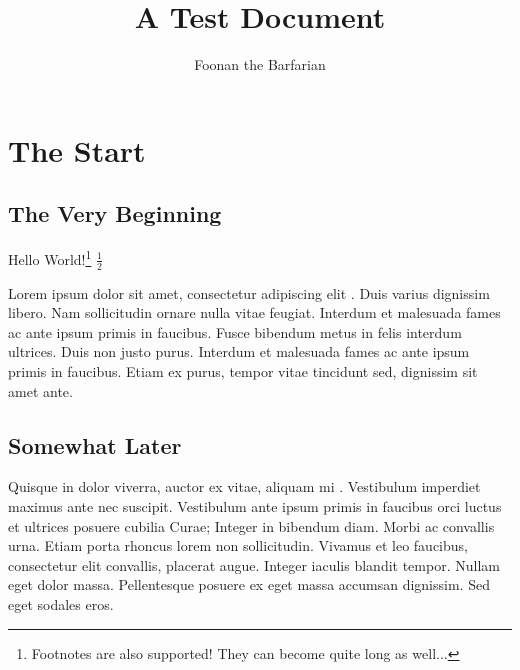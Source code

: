 \documentclass{article}
\begin{document}
\title{A Test Document}
\author{Foonan the Barfarian}

\section{The Start}
\subsection{The Very Beginning}
Hello World!\footnote{Footnotes are also supported! They can become quite long as well...}
$\frac    {1}
2$

Lorem ipsum dolor sit amet, consectetur adipiscing elit \cite{Hox_Gradient}. Duis varius dignissim libero. Nam sollicitudin ornare nulla vitae feugiat. Interdum et malesuada fames ac ante ipsum primis in faucibus. Fusce bibendum metus in felis interdum ultrices. Duis non justo purus. Interdum et malesuada fames ac ante ipsum primis in faucibus. Etiam ex purus, tempor vitae tincidunt sed, dignissim sit amet ante.

\subsection{Somewhat Later}
Quisque in dolor viverra, auctor ex vitae, aliquam mi \cite{foo}. Vestibulum imperdiet maximus ante nec suscipit. Vestibulum ante ipsum primis in faucibus orci luctus et ultrices posuere cubilia Curae; Integer in bibendum diam. Morbi ac convallis urna. Etiam porta rhoncus lorem non sollicitudin. Vivamus et leo faucibus, consectetur elit convallis, placerat augue. Integer iaculis blandit tempor. Nullam eget dolor massa. Pellentesque posuere ex eget massa accumsan dignissim. Sed eget sodales eros.


\end{document}
